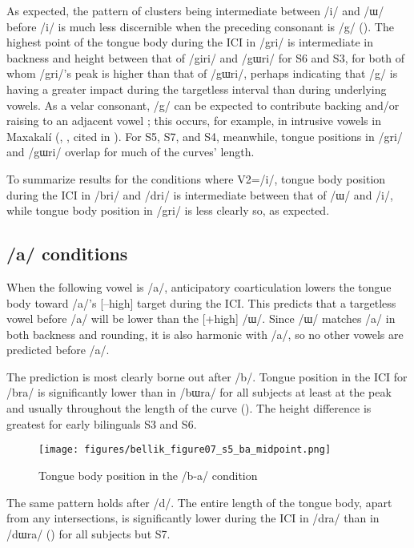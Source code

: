 \documentclass[output=paper,colorlinks,citecolor=brown]{langscibook}
\begin{document}
As expected, the pattern of clusters being intermediate between /i/ and /ɯ/ before /i/ is much less discernible when the preceding consonant is /g/ (). The highest point of the tongue body during the ICI in /gri/ is intermediate in backness and height between that of /giri/ and /gɯri/ for S6 and S3, for both of whom /gri/'s peak is higher than that of /gɯri/, perhaps indicating that /g/ is having a greater impact during the targetless interval than during underlying vowels. As a velar consonant, /g/ can be expected to contribute backing and/or raising to an adjacent vowel \citep{Padgett2011}; this occurs, for example, in intrusive vowels in Maxakalí (\citealt{Gudschinsky1970}, \citealt{Clements1991}, cited in \citealt{Padgett2011}). For S5, S7, and S4, meanwhile, tongue positions in /gri/ and /gɯri/ overlap for much of the curves' length.


To summarize results for the conditions where V2=/i/, tongue body position during the ICI in /bri/ and /dri/ is intermediate between that of /ɯ/ and /i/, while tongue body position in /gri/ is less clearly so, as expected.


\subsection{/a/ conditions}

When the following vowel is /a/, anticipatory coarticulation lowers the tongue body toward /a/’s [–high] target during the ICI. This predicts that a targetless vowel before /a/ will be lower than the [+high] /ɯ/. Since /ɯ/ matches /a/ in both backness and rounding, it is also harmonic with /a/, so no other vowels are predicted before /a/.

The prediction is most clearly borne out after /b/. Tongue position in the ICI for /bra/ is significantly lower than in /bɯra/ for all subjects at least at the peak and usually throughout the length of the curve (). The height difference is greatest for early bilinguals S3 and S6.

\begin{figure}
\caption{Tongue body position in the /b-a/ condition}
\texttt{[image: figures/bellik\_figure07\_s5\_ba\_midpoint.png]}
\label{bas5}
\end{figure}


The same pattern holds after /d/. The entire length of the tongue body, apart from any intersections, is significantly lower during the ICI in /dra/ than in /dɯra/ () for all subjects but S7.
\end{document}
